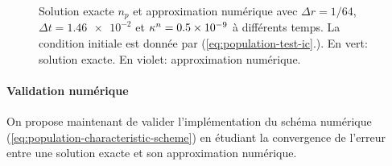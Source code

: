 \begin{figure}[h]
  \begin{center}
    
    
    
    
    
    
  \end{center}
  \begin{center}
    \caption{Solution exacte $n_p$ et approximation numérique avec
      $\Delta r = 1/64$, $\Delta t = \num{1.46e-2}$ et
      $\kappa^n = \num{0.5e-9}$ à différents temps. La
      condition initiale est donnée par
      (\ref{eq:population-test-ic}.). En vert: solution exacte. En
      violet: approximation numérique.}
    \label{fig:population-timelapse}
  \end{center}
\end{figure}

\paragraph{Validation numérique} On propose maintenant de valider
l'implémentation du schéma numérique
(\ref{eq:population-characteristic-scheme}) en étudiant la
convergence de l'erreur entre une solution exacte et son approximation
numérique.

